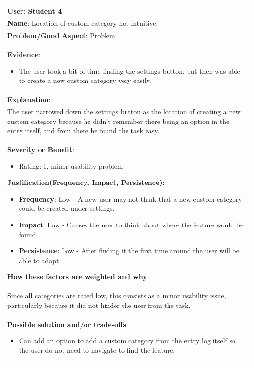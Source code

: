 \documentclass[pdftex,12pt,a4paper]{report}
\begin{document}
\begin{center}
	\begin{tabular}{|p{\textwidth}|}
	\hline
	\textbf{User}: Student 4\\
	\hline
	\textbf{Name}: Location of custom category not intuitive.\\
	\hline
	\textbf{Problem/Good Aspect}: Problem\\
	\hline
	\textbf{Evidence}:
	\begin{itemize}
	\item{The user took a bit of time finding the settings button, but then was able to create a new custom category very easily.}
	\end{itemize}\\
	\hline
	\textbf{Explanation}:\\
	The user narrowed down the settings button as the location of creating a new custom category because he didn't remember there being an option in the entry itself, and from there he found the task easy.\\
	\hline
\textbf{Severity or Benefit}:
	\begin{itemize}
	\item{Rating: 1, minor usability problem}
	\end{itemize}
	\textbf{Justification(Frequency, Impact, Persistence)}:
	\begin{itemize}
	\item{\textbf{Frequency}:} Low - A new user may not think that a new custom category could be created under settings.
	\item{\textbf{Impact}:} Low - Causes the user to think about where the feature would be found.
	\item{\textbf{Persistence}:} Low - After finding it the first time around the user will be able to adapt.
	\end{itemize}
	\textbf{How these factors are weighted and why}:\\
	Since all categories are rated low, this consists as a minor usability issue, particularly because it did not hinder the user from the task.\\
	\hline
	\textbf{Possible solution and/or trade-offs}:
	\begin{itemize}
	\item{Can add an option to add a custom category from the entry log itself so the user do not need to navigate to find the feature.}
	\end{itemize}\\
	\hline
	\end{tabular}
\end{center}
\end{document}
